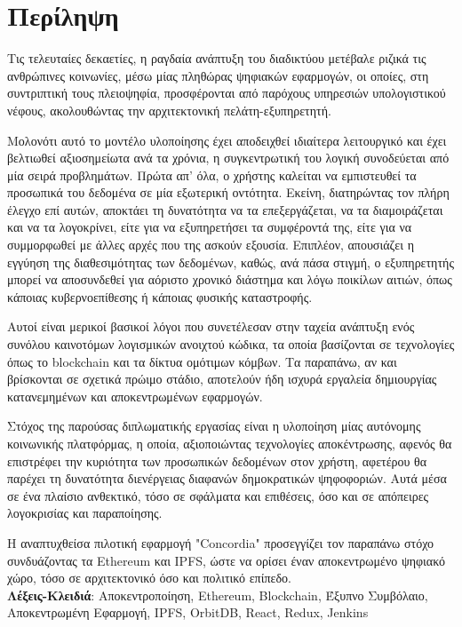 \chapter*{Περίληψη}

Τις τελευταίες δεκαετίες, η ραγδαία ανάπτυξη του διαδικτύου μετέβαλε ριζικά τις ανθρώπινες
κοινωνίες, μέσω μίας πληθώρας ψηφιακών εφαρμογών, οι οποίες, στη συντριπτική τους πλειοψηφία, προσφέρονται από παρόχους υπηρεσιών υπολογιστικού νέφους, ακολουθώντας την αρχιτεκτονική πελάτη-εξυπηρετητή.

Μολονότι αυτό το μοντέλο υλοποίησης έχει αποδειχθεί ιδιαίτερα λειτουργικό και έχει βελτιωθεί αξιοσημείωτα ανά τα χρόνια, η συγκεντρωτική του λογική συνοδεύεται από μία σειρά προβλημάτων. Πρώτα απ' όλα, ο χρήστης καλείται να εμπιστευθεί τα προσωπικά του δεδομένα σε μία εξωτερική οντότητα. Εκείνη, διατηρώντας τον πλήρη έλεγχο επί αυτών, αποκτάει τη δυνατότητα να τα επεξεργάζεται, να τα διαμοιράζεται και να τα λογοκρίνει, είτε για να εξυπηρετήσει τα συμφέροντά της, είτε για να συμμορφωθεί με άλλες αρχές που της ασκούν εξουσία. Επιπλέον, απουσιάζει η εγγύηση της διαθεσιμότητας των δεδομένων, καθώς, ανά πάσα στιγμή, ο εξυπηρετητής μπορεί να αποσυνδεθεί για αόριστο χρονικό διάστημα και λόγω ποικίλων αιτιών, όπως κάποιας κυβερνοεπίθεσης ή κάποιας φυσικής καταστροφής.

Αυτοί είναι μερικοί βασικοί λόγοι που συνετέλεσαν στην ταχεία ανάπτυξη ενός συνόλου καινοτόμων λογισμικών ανοιχτού κώδικα, τα οποία βασίζονται σε τεχνολογίες όπως το blockchain και τα δίκτυα ομότιμων κόμβων. Τα παραπάνω, αν και βρίσκονται σε σχετικά πρώιμο στάδιο, αποτελούν ήδη ισχυρά εργαλεία δημιουργίας κατανεμημένων και αποκεντρωμένων εφαρμογών.

Στόχος της παρούσας διπλωματικής εργασίας είναι η υλοποίηση μίας αυτόνομης κοινωνικής πλατφόρμας,
η οποία, αξιοποιώντας τεχνολογίες αποκέντρωσης, αφενός θα επιστρέφει την κυριότητα των προσωπικών
δεδομένων στον χρήστη, αφετέρου θα παρέχει τη δυνατότητα διενέργειας διαφανών δημοκρατικών ψηφοφοριών. Αυτά μέσα σε ένα πλαίσιο ανθεκτικό, τόσο σε σφάλματα και επιθέσεις, όσο και σε απόπειρες λογοκρισίας και παραποίησης.

Η αναπτυχθείσα πιλοτική εφαρμογή "Concordia" προσεγγίζει τον παραπάνω στόχο συνδυάζοντας τα Ethereum και IPFS, ώστε να ορίσει έναν αποκεντρωμένο ψηφιακό χώρο, τόσο σε αρχιτεκτονικό όσο και πολιτικό επίπεδο.
\\[2\baselineskip]
\textbf{Λέξεις-Κλειδιά}: Αποκεντροποίηση, Ethereum, Blockchain, Έξυπνο Συμβόλαιο, Αποκεντρωμένη Εφαρμογή, IPFS, OrbitDB, React, Redux, Jenkins